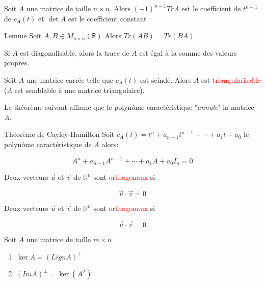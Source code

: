         \begin{theoreme}
            Soit $A$ une matrice de taille $n \times n$. Alors $(-1)^{n-1}TrA$ est le coefficient de $t^{n-1}$ de $c_A(t)$ et $\det A$ est le coefficient constant
        \end{theoreme}
        \begin{theoreme}{Lemme}
            Soit $A, B \in M_{n \times n}(\mathbb{R}) $ Alors $Tr(AB) = Tr(BA)$
        \end{theoreme}
        \begin{theoreme}
            Si $A$ est diagonalisable, alors la trace de $A$ est égal à la somme des valeurs propres.
        \end{theoreme}
    \begin{theoreme}
        Soit $A$ une matrice carrée telle que $c_A(t)$ est scindé. Alors $A$ est  \textcolor{red}{triangularisable} ($A$ est semblable à une matrice triangulaire).
    \end{theoreme}
    Le théorème suivant affirme que le polynôme caractéristique "\textit{annule}" la matrice $A$.
    \begin{theoreme}{Théorème de Cayley-Hamilton}
        Soit $c_A(t) = t^n + a_{n-1}t^{n-1} + \cdots + a_1 t + a_0$ le polynôme caractéristique de $A$ alors:
        \begin{formule}
            \[A^n + a_{n-1}A^{n-1} + \cdots + a_1A + a_0I_n = 0\]
        \end{formule}
    \end{theoreme}
    \begin{definition}
        Deux vecteurs $\vec{u}$ et $\vec{v}$ de $\mathbb{R}^n$ sont \textcolor{red}{orthogonaux} si 
        \begin{formule}
            \[\vec{u}\cdot \vec{v} = 0\]
        \end{formule}
    \end{definition}
    \begin{definition}
        Deux vecteurs $\vec{u}$ et $\vec{v}$ de $\mathbb{R}^n$ sont \textcolor{red}{orthogonaux} si 
        \begin{formule}
            \[\vec{u}\cdot \vec{v} = 0\]
        \end{formule}
    \end{definition}
    \begin{theoreme}
        Soit $A$ une matrice de taille $m \times n$
        \begin{enumerate}
            \item $\ker A = (LignA)^\perp$
            \item $(ImA)^\perp = \ker(A^T)$
        \end{enumerate}
    \end{theoreme}
